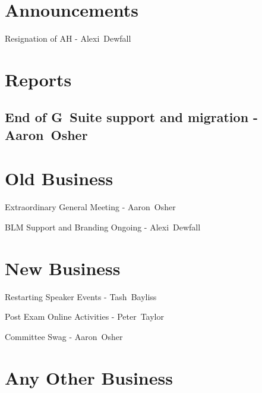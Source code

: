 \documentclass[11pt,hacksoc,agenda]{meetingmins}
\begin{document}
\maketitle

\section{Announcements}
\begin{items}
\item{Resignation of AH - Alexi~Dewfall}
\end{items}

\section{Reports}
\subsection{End of G~Suite support and migration - Aaron~Osher}
\begin{hiddensubitems}
\item {}
\end{hiddensubitems}

\section{Old Business}
\begin{items}
\item {Extraordinary General Meeting - Aaron~Osher} 
\item {BLM Support and Branding Ongoing - Alexi~Dewfall}
\end{items}

\section{New Business}
\begin{items}
\item {Restarting Speaker Events - Tash~Bayliss}
\item {Post Exam Online Activities - Peter~Taylor}
\item {Committee Swag - Aaron~Osher}
\end{items}

\section{Any Other Business}

\vspace{1em}
\nextmeeting{}
\end{document}
